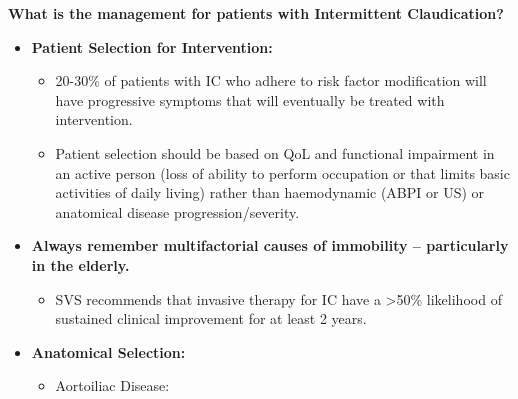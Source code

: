 \documentclass[
]{book}
\providecommand{\tightlist}{%
  \setlength{\itemsep}{0pt}\setlength{\parskip}{0pt}}
\begin{document}
\textbf{What is the management for patients with Intermittent Claudication?}

\begin{itemize}
\item
  \textbf{Patient Selection for Intervention:}

  \begin{itemize}
  \item
    20-30\% of patients with IC who adhere to risk factor
    modification will have progressive symptoms that will eventually
    be treated with intervention.
  \item
    Patient selection should be based on QoL and functional
    impairment in an active person (loss of ability to perform
    occupation or that limits basic activities of daily living)
    rather than haemodynamic (ABPI or US) or anatomical disease
    progression/severity.
  \end{itemize}
\item
  \textbf{Always remember multifactorial causes of immobility --
  particularly in the elderly.}

  \begin{itemize}
  \tightlist
  \item
    SVS recommends that invasive therapy for IC have a \textgreater50\%
    likelihood of sustained clinical improvement for at least 2
    years.
  \end{itemize}
\item
  \textbf{Anatomical Selection:}

  \begin{itemize}
  \item
    Aortoiliac Disease:


\end{itemize}
\end{itemize}
\end{document}
